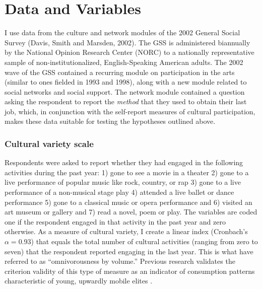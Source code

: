 \documentclass[12pt]{article}
\begin{document}
\section{Data and Variables}
I use data from the culture and network modules of the 2002 General Social Survey (Davis, Smith and Marsden, 2002). The GSS is administered biannually by the National Opinion Research Center (NORC) to a nationally representative sample of non-institutionalized, English-Speaking American adults. The 2002 wave of the GSS contained a recurring module on participation in the arts (similar to ones fielded in 1993 and 1998), along with a new module related to social networks and social support. The network module contained a question asking the respondent to report the \emph{method} that they used to obtain their last job, which, in conjunction with the self-report measures of cultural participation, makes these data suitable for testing the hypotheses outlined above.

\subsubsection{Cultural variety scale}
Respondents were asked to report whether they had engaged in the following activities during the past year: 1) gone to see a movie in a theater 2) gone to a live performance of popular music like rock, country, or rap 3) gone to a live performance of a non-musical stage play 4) attended a live ballet or dance performance 5) gone to a classical music or opera performance and 6) visited an art museum or gallery and 7) read a novel, poem or play. The variables are coded one if the respondent engaged in that activity in the past year and zero otherwise. As a measure of cultural variety, I create a linear index (Cronbach's $\alpha=0.93$) that equals the total number of cultural activities (ranging from zero to seven) that the respondent reported engaging in the last year.  This is what \citep{warde_etal08} have referred to as ``omnivorousness by volume.'' Previous research validates the criterion validity of this type of measure as an indicator of consumption patterns characteristic of young, upwardly mobile elites \citep[e.g.][]{bryson96, sullivan_katzgerro07, warde_etal08}.
\end{document}
